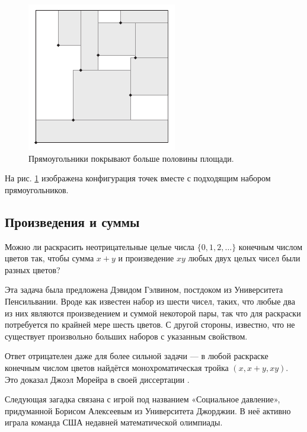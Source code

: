 \begin{figure}[htb!]
\centering
\includegraphics[scale=1]{pics/square}
\caption{Прямоугольники покрывают больше половины площади.}
\label{pic:square}
\end{figure}

На рис. \ref{pic:square} изображена конфигурация точек вместе с подходящим набором прямоугольников.

\subsection*{Произведения и суммы}

Можно ли раскрасить неотрицательные целые числа $\{0,1,2,\dots\}$ конечным числом цветов так, чтобы сумма $x+y$ и произведение $xy$ любых двух целых чисел были разных цветов?

\medskip

Эта задача была предложена Дэвидом Гэлвином, постдоком из Университета Пенсильвании.
Вроде как известен набор из шести чисел, таких, что любые два из них являются произведением и суммой некоторой пары, так что для раскраски потребуется по крайней мере шесть цветов.
С другой стороны, известно, что не существует произвольно больших наборов с указанным свойством.

\begin{addedbytheeditors}
Ответ отрицателен даже для более сильной задачи --- в любой раскраске конечным числом цветов найдётся монохроматическая тройка $(x,x+y,xy)$.
Это доказал Джоэл Морейра в своей диссертации \cite{moreira}.\pr
\end{addedbytheeditors}


\medskip

Следующая загадка связана с игрой под названием «Социальное давление», придуманной Борисом Алексеевым из Университета Джорджии.
В неё активно играла команда США недавней математической олимпиады.

